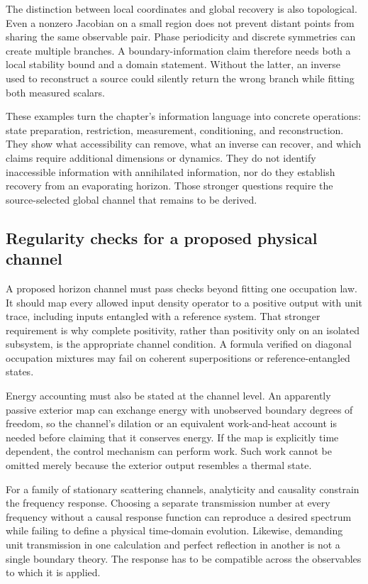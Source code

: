 The distinction between local coordinates and global recovery is also topological. Even a nonzero Jacobian on a small region does not prevent distant points from sharing the same observable pair. Phase periodicity and discrete symmetries can create multiple branches. A boundary-information claim therefore needs both a local stability bound and a domain statement. Without the latter, an inverse used to reconstruct a source could silently return the wrong branch while fitting both measured scalars.

These examples turn the chapter's information language into concrete operations: state preparation, restriction, measurement, conditioning, and reconstruction. They show what accessibility can remove, what an inverse can recover, and which claims require additional dimensions or dynamics. They do not identify inaccessible information with annihilated information, nor do they establish recovery from an evaporating horizon. Those stronger questions require the source-selected global channel that remains to be derived.

\subsection{Regularity checks for a proposed physical channel}
A proposed horizon channel must pass checks beyond fitting one occupation law. It should map every allowed input density operator to a positive output with unit trace, including inputs entangled with a reference system. That stronger requirement is why complete positivity, rather than positivity only on an isolated subsystem, is the appropriate channel condition. A formula verified on diagonal occupation mixtures may fail on coherent superpositions or reference-entangled states.

Energy accounting must also be stated at the channel level. An apparently passive exterior map can exchange energy with unobserved boundary degrees of freedom, so the channel's dilation or an equivalent work-and-heat account is needed before claiming that it conserves energy. If the map is explicitly time dependent, the control mechanism can perform work. Such work cannot be omitted merely because the exterior output resembles a thermal state.

For a family of stationary scattering channels, analyticity and causality constrain the frequency response. Choosing a separate transmission number at every frequency without a causal response function can reproduce a desired spectrum while failing to define a physical time-domain evolution. Likewise, demanding unit transmission in one calculation and perfect reflection in another is not a single boundary theory. The response has to be compatible across the observables to which it is applied.

